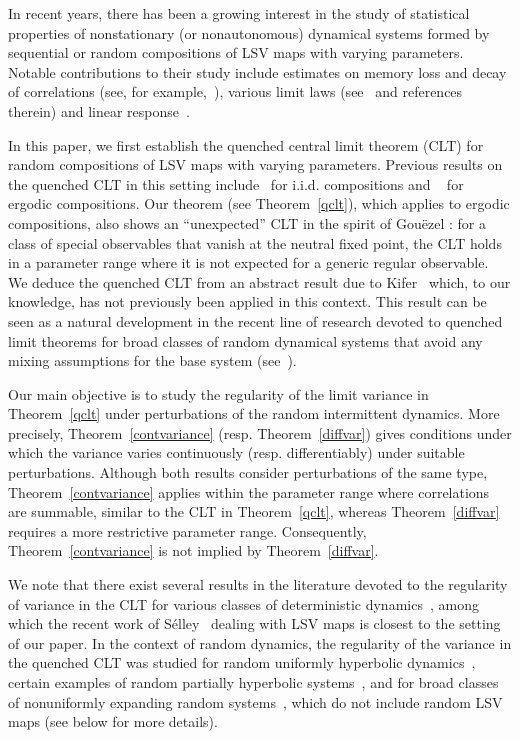 \documentclass[12pt,reqno,a4paper]{article}
\begin{document}
	In recent years, there has been a growing interest in the study of statistical properties of nonstationary (or nonautonomous) dynamical systems formed by sequential or random compositions of LSV maps with varying parameters. Notable contributions to their study include estimates on memory loss and decay of correlations (see, for example,~\cite{AHNTV, BBD, BBR, KL,KL2, leppanen2017functional}), various limit laws (see~\cite{ANT, BB, bose2021random, HL,  NPT, NTV,  Su, Su2} and references therein) and linear response~\cite{bahsoun2020linear, DGTS}.
	
	In this paper, we first establish the quenched central limit theorem (CLT) for random compositions of LSV maps 
	with varying parameters. Previous results on the quenched CLT in this setting include~\cite{NPT, NTV} for 
	i.i.d. compositions 
	and ~\cite{Su2} for ergodic compositions. Our theorem (see Theorem~\ref{qclt}), which applies to ergodic compositions, also shows
	an ``unexpected'' CLT in the spirit of  Gou\"{e}zel \cite{G}: for a class of special observables that vanish 
	at the neutral fixed point, the CLT holds in a parameter range where it is not expected for a 
	generic regular observable.
	We deduce the quenched CLT from an abstract result
	due to Kifer~\cite[Theorem 2.3.]{K} which, to our knowledge, has not previously been applied in this context. This result can be seen as a natural development in the recent line of research devoted to quenched limit theorems for broad classes of random dynamical systems that avoid any mixing assumptions for the base system (see~\cite{DFGTV, DFGTV2, DH, HK}).
	
	Our main objective is to study the regularity of the limit variance in Theorem~\ref{qclt} under perturbations of the random intermittent dynamics. More precisely, Theorem~\ref{contvariance} (resp. Theorem~\ref{diffvar}) gives conditions under which the variance varies continuously (resp. differentiably) under suitable perturbations. 
	Although both results consider perturbations of the same type, Theorem~\ref{contvariance} applies within the parameter range where correlations are summable, similar to the CLT in Theorem~\ref{qclt}, whereas Theorem~\ref{diffvar} requires a more restrictive parameter range.
	Consequently, Theorem~\ref{contvariance} is not implied by Theorem~\ref{diffvar}.
	
	We note that there exist several results in the literature devoted to the regularity of variance in the CLT for various classes of deterministic dynamics~\cite{BMR, BCV, GKLM, Selley}, among which the recent work of S\'elley~\cite{Selley} dealing with LSV maps is closest to the setting of our paper. In the context of random dynamics, the regularity of the variance in the quenched CLT was studied for random uniformly hyperbolic dynamics~\cite{DS}, certain examples of random partially hyperbolic systems~\cite{CN}, and for broad classes of nonuniformly 
	expanding random systems~\cite{DH2}, which do not include random LSV maps (see below for more details).
	
\end{document}

